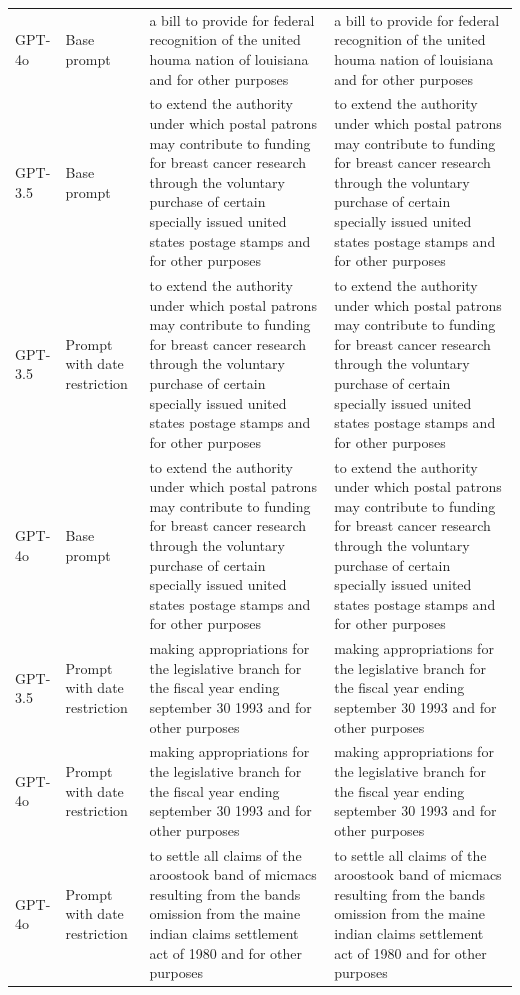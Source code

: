 \begin{longtable}{>{\raggedright\arraybackslash}p{1.4cm}>{\raggedright\arraybackslash}p{1.4cm}>{\raggedright\arraybackslash}p{5.5cm}>{\raggedright\arraybackslash}p{5.5cm}}
GPT-4o & Base prompt & a bill to provide for federal recognition of the united houma nation of louisiana and for other purposes & a bill to provide for federal recognition of the united houma nation of louisiana and for other purposes\\
GPT-3.5 & Base prompt & to extend the authority under which postal patrons may contribute to funding for breast cancer research through the voluntary purchase of certain specially issued united states postage stamps and for other purposes & to extend the authority under which postal patrons may contribute to funding for breast cancer research through the voluntary purchase of certain specially issued united states postage stamps and for other purposes\\
GPT-3.5 & Prompt with date restriction & to extend the authority under which postal patrons may contribute to funding for breast cancer research through the voluntary purchase of certain specially issued united states postage stamps and for other purposes & to extend the authority under which postal patrons may contribute to funding for breast cancer research through the voluntary purchase of certain specially issued united states postage stamps and for other purposes\\
GPT-4o & Base prompt & to extend the authority under which postal patrons may contribute to funding for breast cancer research through the voluntary purchase of certain specially issued united states postage stamps and for other purposes & to extend the authority under which postal patrons may contribute to funding for breast cancer research through the voluntary purchase of certain specially issued united states postage stamps and for other purposes\\
GPT-3.5 & Prompt with date restriction & making appropriations for the legislative branch for the fiscal year ending september 30 1993 and for other purposes & making appropriations for the legislative branch for the fiscal year ending september 30 1993 and for other purposes\\
GPT-4o & Prompt with date restriction & making appropriations for the legislative branch for the fiscal year ending september 30 1993 and for other purposes & making appropriations for the legislative branch for the fiscal year ending september 30 1993 and for other purposes\\
GPT-4o & Prompt with date restriction & to settle all claims of the aroostook band of micmacs resulting from the bands omission from the maine indian claims settlement act of 1980 and for other purposes & to settle all claims of the aroostook band of micmacs resulting from the bands omission from the maine indian claims settlement act of 1980 and for other purposes\\

\end{longtable}
